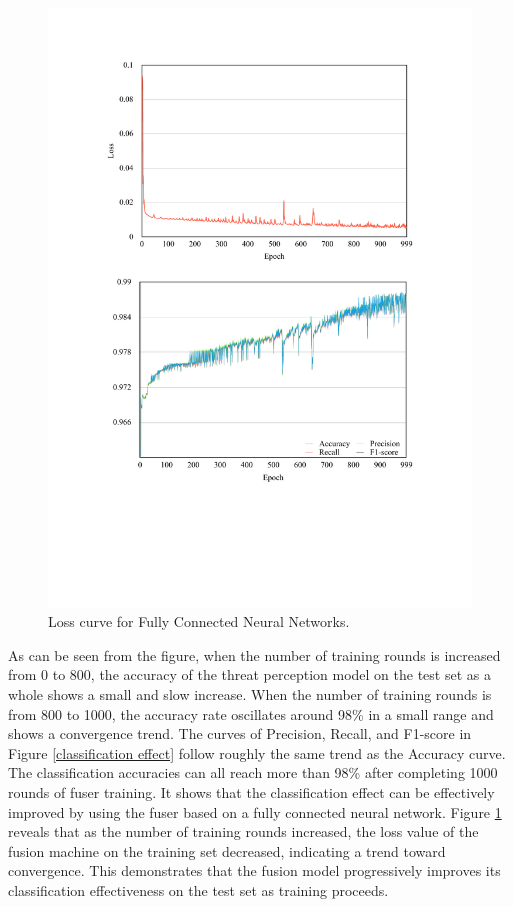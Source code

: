 \documentclass[journal]{IEEEtai}
\begin{document}
\begin{figure}[!h]
	\centering
	\includegraphics[width = \linewidth]{Figures/Loss.pdf}
	\caption{Loss curve for Fully Connected Neural Networks.}
	\label{Loss}
\end{figure}

As can be seen from the figure, when the number of training rounds is increased from 0 to 800, the accuracy of the threat perception model on the test set as a whole shows a small and slow increase. 
When the number of training rounds is from 800 to 1000, the accuracy rate oscillates around 98\% in a small range and shows a convergence trend.
The curves of Precision, Recall, and F1-score in Figure \ref{classification effect} follow roughly the same trend as the Accuracy curve. 
The classification accuracies can all reach more than 98\% after completing 1000 rounds of fuser training.
It shows that the classification effect can be effectively improved by using the fuser based on a fully connected neural network.
Figure \ref{Loss} reveals that as the number of training rounds increased, the loss value of the fusion machine on the training set decreased, indicating a trend toward convergence. 
This demonstrates that the fusion model progressively improves its classification effectiveness on the test set as training proceeds.
\end{document}
